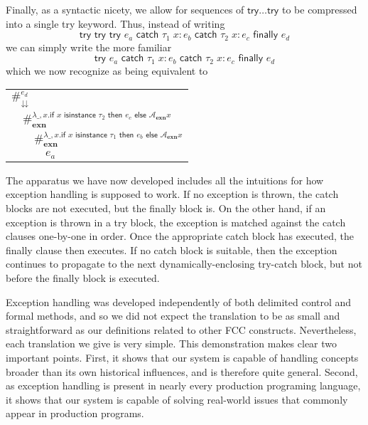 \documentclass[11pt]{article}
\newcommand\A{\mathcal{A}}
\begin{document}
Finally, as a syntactic nicety, we allow for sequences of $\textsf{try}\ldots\textsf{try}$ to be compressed into a single \textsf{try} keyword.
Thus, instead of writing
$$\textsf{try try try }e_a\textsf{ catch }\tau_1\;x:e_b\textsf{ catch }\tau_2\;x:e_c\textsf{ finally }e_d$$
we can simply write the more familiar
$$\textsf{try }e_a\textsf{ catch }\tau_1\;x:e_b\textsf{ catch }\tau_2\;x:e_c\textsf{ finally }e_d$$
which we now recognize as being equivalent to

\begin{tabular}{l}
$\#_\downdownarrows^{e_d}$ \\
  $\quad\#_\mathbf{exn}^{\lambda \_,x.
  	\textsf{if }x\textsf{ isinstance }\tau_2
	\textsf{ then }e_c
	\textsf{ else }\A_\mathbf{exn}x}$ \\
  $\qquad\#_\mathbf{exn}^{\lambda \_,x.
  	\textsf{if }x\textsf{ isinstance }\tau_1
	\textsf{ then }e_b
	\textsf{ else }\A_\mathbf{exn}x}$ \\
  $\qquad\quad e_a$ \\
\end{tabular}

The apparatus we have now developed includes all the intuitions for how exception handling is supposed to work.
If no exception is thrown, the catch blocks are not executed, but the finally block is.
On the other hand, if an exception is thrown in a try block, the exception is matched against the catch clauses one-by-one in order.
Once the appropriate catch block has executed, the finally clause then executes.
If no catch block is suitable, then the exception continues to propagate to the next dynamically-enclosing try-catch block, but not before the finally block is executed.

Exception handling was developed independently of both delimited control and formal methods, and so we did not expect the translation to be as small and straightforward as our definitions related to other FCC constructs.
Nevertheless, each translation we give is very simple.
This demonstration makes clear two important points.
First, it shows that our system is capable of handling concepts broader than its own historical influences, and is therefore quite general.
Second, as exception handling is present in nearly every production programing language, it shows that our system is capable of solving real-world issues that commonly appear in production programs.
\end{document}
